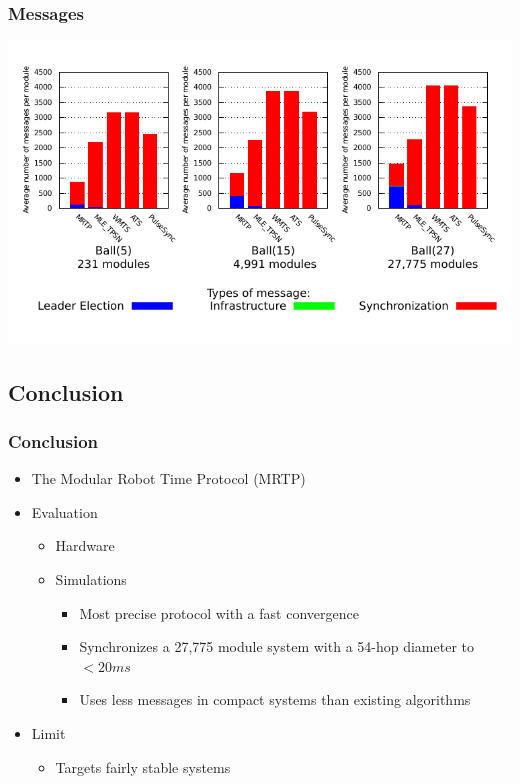 \begin{frame} \frametitle{Messages}

\begin{center}
	\includegraphics[width=0.9\linewidth]{fig/synchronization/messages}
\end{center}


\end{frame}

\subsection{Conclusion}

\begin{frame} \frametitle{Conclusion}

\begin{itemize}
	\item The Modular Robot Time Protocol (MRTP)
	\item Evaluation
	\begin{itemize}
		\item Hardware
		\item Simulations
		\begin{itemize}
			\item Most precise protocol with a fast convergence
			\item Synchronizes a 27,775 module system with a 54-hop diameter to $< 20ms$ 
			\item Uses less messages in compact systems than existing algorithms
		\end{itemize}
	\end{itemize}
	\item Limit
	\begin{itemize}
		\item Targets fairly stable systems
	\end{itemize}
\end{itemize}
\end{frame}